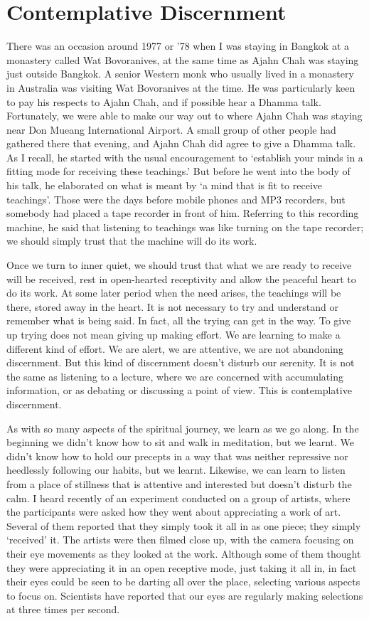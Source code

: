 \section{Contemplative Discernment}

There was an occasion around 1977 or '78 when I was staying in Bangkok
at a monastery called Wat Bovoranives, at the same time as Ajahn Chah
was staying just outside Bangkok. A senior Western monk who usually
lived in a monastery in Australia was visiting Wat Bovoranives at the
time. He was particularly keen to pay his respects to Ajahn Chah, and if
possible hear a Dhamma talk. Fortunately, we were able to make our way
out to where Ajahn Chah was staying near Don Mueang International
Airport. A small group of other people had gathered there that evening,
and Ajahn Chah did agree to give a Dhamma talk. As I recall, he started
with the usual encouragement to ‘establish your minds in a fitting mode
for receiving these teachings.’ But before he went into the body of his
talk, he elaborated on what is meant by ‘a mind that is fit to receive
teachings’. Those were the days before mobile phones and MP3 recorders,
but somebody had placed a tape recorder in front of him. Referring to
this recording machine, he said that listening to teachings was like
turning on the tape recorder; we should simply trust that the machine
will do its work.

Once we turn to inner quiet, we should trust that what we are ready to
receive will be received, rest in open-hearted receptivity and allow the
peaceful heart to do its work. At some later period when the need
arises, the teachings will be there, stored away in the heart. It is not
necessary to try and understand or remember what is being said. In fact,
all the trying can get in the way. To give up trying does not mean
giving up making effort. We are learning to make a different kind of
effort. We are alert, we are attentive, we are not abandoning
discernment. But this kind of discernment doesn’t disturb our serenity.
It is not the same as listening to a lecture, where we are concerned
with accumulating information, or as debating or discussing a point of
view. This is contemplative discernment.

As with so many aspects of the spiritual journey, we learn as we go
along. In the beginning we didn’t know how to sit and walk in
meditation, but we learnt. We didn’t know how to hold our precepts in a
way that was neither repressive nor heedlessly following our habits, but
we learnt. Likewise, we can learn to listen from a place of stillness
that is attentive and interested but doesn’t disturb the calm. I heard
recently of an experiment conducted on a group of artists, where the
participants were asked how they went about appreciating a work of art.
Several of them reported that they simply took it all in as one piece;
they simply ‘received’ it. The artists were then filmed close up, with
the camera focusing on their eye movements as they looked at the work.
Although some of them thought they were appreciating it in an open
receptive mode, just taking it all in, in fact their eyes could be seen
to be darting all over the place, selecting various aspects to focus on.
Scientists have reported that our eyes are regularly making selections
at three times per second.

